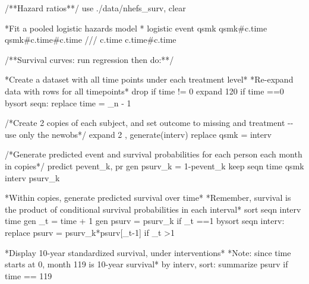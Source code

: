 \documentclass[
  10pt,
  a4paper,
]{book}
\newenvironment{Shaded}{\begin{snugshade}}{\end{snugshade}}
\newcommand{\BaseNTok}[1]{\textcolor[rgb]{0.68,0.00,0.00}{#1}}
\newcommand{\CommentTok}[1]{\textcolor[rgb]{0.37,0.37,0.37}{#1}}
\newcommand{\DataTypeTok}[1]{\textcolor[rgb]{0.68,0.00,0.00}{#1}}
\newcommand{\DecValTok}[1]{\textcolor[rgb]{0.68,0.00,0.00}{#1}}
\newcommand{\FunctionTok}[1]{\textcolor[rgb]{0.28,0.35,0.67}{#1}}
\newcommand{\KeywordTok}[1]{\textcolor[rgb]{0.00,0.46,0.62}{#1}}
\newcommand{\NormalTok}[1]{\textcolor[rgb]{0.00,0.46,0.62}{#1}}
\newcommand{\OtherTok}[1]{\textcolor[rgb]{0.00,0.46,0.62}{#1}}
\begin{document}
\begin{Shaded}
\begin{Highlighting}[]
\CommentTok{/**Hazard ratios**/}
\KeywordTok{use}\NormalTok{ ./}\KeywordTok{data}\NormalTok{/nhefs\_surv, }\KeywordTok{clear}

\NormalTok{*Fit a pooled }\KeywordTok{logistic}\NormalTok{ hazards }\KeywordTok{model}\NormalTok{ *}
\KeywordTok{logistic}\NormalTok{ event qsmk qsmk\#c.time qsmk\#c.time\#c.time }\CommentTok{///}
\NormalTok{  c.time c.time\#c.time }

\CommentTok{/**Survival curves: run regression then do:**/}

\NormalTok{*Create a dataset with }\OtherTok{all}\NormalTok{ time points under each treatment }\DecValTok{level}\NormalTok{*}
\NormalTok{*Re{-}expand }\KeywordTok{data}\NormalTok{ with }\BaseNTok{rows} \KeywordTok{for} \OtherTok{all}\NormalTok{ timepoints*}
\KeywordTok{drop} \KeywordTok{if}\NormalTok{ time != 0}
\NormalTok{expand 120 }\KeywordTok{if}\NormalTok{ time ==0 }
\KeywordTok{bysort}\NormalTok{ seqn: }\KeywordTok{replace}\NormalTok{ time = }\DataTypeTok{\_n}\NormalTok{ {-} 1   }
        
\CommentTok{/*Create 2 copies of each subject, and set outcome to missing }
\CommentTok{and treatment {-}{-} use only the newobs*/}
\NormalTok{expand 2 , }\KeywordTok{generate}\NormalTok{(interv) }
\KeywordTok{replace}\NormalTok{ qsmk = interv   }

\CommentTok{/*Generate predicted event and survival probabilities }
\CommentTok{for each person each month in copies*/}
\KeywordTok{predict}\NormalTok{ pevent\_k, pr}
\KeywordTok{gen}\NormalTok{ psurv\_k = 1{-}pevent\_k}
\KeywordTok{keep}\NormalTok{ seqn time qsmk interv psurv\_k }

\NormalTok{*Within copies, }\KeywordTok{generate}\NormalTok{ predicted survival }\BaseNTok{over}\NormalTok{ time*}
\NormalTok{*Remember, survival is the product }\KeywordTok{of}\NormalTok{ conditional survival probabilities }\KeywordTok{in}\NormalTok{ each interval*  }
\KeywordTok{sort}\NormalTok{ seqn interv time}
\KeywordTok{gen}\NormalTok{ \_t = time + 1}
\KeywordTok{gen}\NormalTok{ psurv = psurv\_k }\KeywordTok{if}\NormalTok{ \_t ==1       }
\KeywordTok{bysort}\NormalTok{ seqn interv: }\KeywordTok{replace}\NormalTok{ psurv = psurv\_k*psurv[\_t{-}1] }\KeywordTok{if}\NormalTok{ \_t \textgreater{}1 }

\NormalTok{*Display 10{-}}\FunctionTok{year}\NormalTok{ standardized survival, under interventions*}
\NormalTok{*Note: since time starts }\FunctionTok{at}\NormalTok{ 0, }\FunctionTok{month}\NormalTok{ 119 is 10{-}}\FunctionTok{year}\NormalTok{ survival*}
\KeywordTok{by}\NormalTok{ interv, }\KeywordTok{sort}\NormalTok{: }\KeywordTok{summarize}\NormalTok{ psurv }\KeywordTok{if}\NormalTok{ time == 119}


\end{Highlighting}
\end{Shaded}
\end{document}
